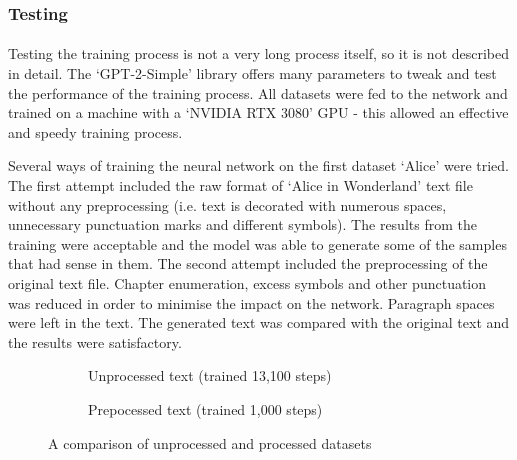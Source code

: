 \documentclass[12pt]{report}
\begin{document}
\clearpage

\subsubsection*{Testing}
\paragraph{}
\label{sec:model_testing}
Testing the training process is not a very long process itself, so it is not described in detail. The `GPT-2-Simple'
library offers many parameters to tweak and test the performance of the training process. All datasets were fed to the
network and trained on a machine with a `NVIDIA RTX 3080' GPU - this allowed an effective and speedy training process.

Several ways of training the neural network on the first dataset `Alice' were tried. The first attempt included
the raw format of `Alice in Wonderland' text file without any preprocessing (i.e. text is decorated with numerous
spaces, unnecessary punctuation marks and different symbols). The results from the training were acceptable and
the model was able to generate some of the samples that had sense in them. The second attempt included the preprocessing
of the original text file. Chapter enumeration, excess symbols and other punctuation was reduced in order to
minimise the impact on the network. Paragraph spaces were left in the text. The generated text was compared with the
original text and the results were satisfactory.

\begin{figure}[ht]
  \captionsetup[subfigure]{labelformat=empty}
  \centering
  \begin{subfigure}{.5\textwidth}
    \centering
    \caption{Unprocessed text (trained 13,100 steps)}
    \label{fig:unprocess-alice}
  \end{subfigure}%
  \begin{subfigure}{.5\textwidth}
    \centering
    \caption{Prepocessed text (trained 1,000 steps)}
    \label{fig:preprocess-alice}
  \end{subfigure}
  \caption{A comparison of unprocessed and processed datasets}
  \label{fig:comparison_process_unprocess}
\end{figure}
\end{document}
